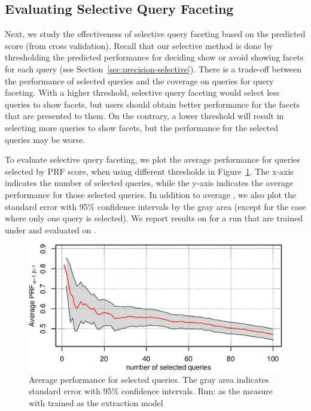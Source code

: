 \subsection{Evaluating Selective Query Faceting}
Next, we study the effectiveness of selective query faceting based on the predicted score (from cross validation). Recall that our selective method is done by thresholding the predicted performance for deciding show or avoid showing facets for each query (see Section~\ref{sec:precision-selective}). There is a trade-off between the performance of selected queries and the coverage on queries for query faceting. With a higher threshold, selective query faceting would select less queries to show facets, but users should obtain better performance for the facets that are presented to them. On the contrary, a lower threshold will result in selecting more queries to show facets, but the performance for the selected queries may be worse. 

To evaluate selective query faceting, we plot the average \PRF performance for queries selected by PRF score, when using different thresholds in Figure~\ref{fig:selective}. The x-axis indicates the number of selected queries, while the y-axis indicates the average \PRF performance for those selected queries. In addition to average \PRF, we also plot the standard error with 95\% confidence intervals by the gray area (except for the case where only one query is selected). We report results on \DQF for a \QFI run that are trained under \MLE and evaluated on . 

\begin{figure}[ht!]
\centering
\caption{Average \PRF performance for selected queries. The gray area indicates standard error with 95\% confidence intervals. Run:  as the measure with \MLE trained \QFI as the extraction model}
\label{fig:selective}
\includegraphics[width=0.8\columnwidth]{figure/qf13-qp-prf-ll.eps}
\end{figure}

